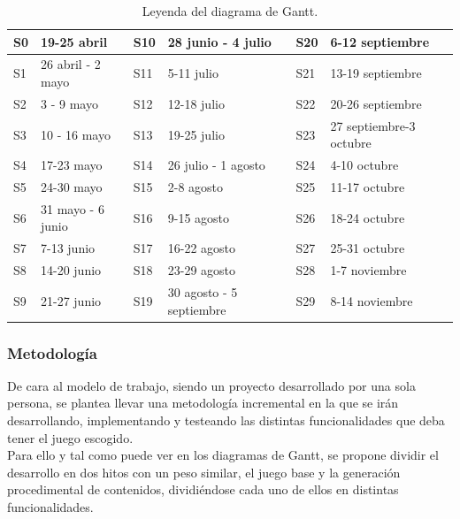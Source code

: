     
    \begin{table}[H]
        \centering
        \caption{Leyenda del diagrama de Gantt.}
        \begin{tabular}{|l|l|l|l|l|l|}
        \hline
        S0 & 19-25 abril       & S10 & 28 junio - 4 julio       & S20 & 6-12 septiembre         \\ \hline
        S1 & 26 abril - 2 mayo & S11 & 5-11 julio               & S21 & 13-19 septiembre        \\ \hline
        S2 & 3 - 9 mayo        & S12 & 12-18 julio              & S22 & 20-26 septiembre        \\ \hline
        S3 & 10 - 16 mayo      & S13 & 19-25 julio              & S23 & 27 septiembre-3 octubre \\ \hline
        S4 & 17-23 mayo        & S14 & 26 julio - 1 agosto      & S24 & 4-10 octubre            \\ \hline
        S5 & 24-30 mayo        & S15 & 2-8 agosto               & S25 & 11-17 octubre           \\ \hline
        S6 & 31 mayo - 6 junio & S16 & 9-15 agosto              & S26 & 18-24 octubre           \\ \hline
        S7 & 7-13 junio        & S17 & 16-22 agosto             & S27 & 25-31 octubre           \\ \hline
        S8 & 14-20 junio       & S18 & 23-29 agosto             & S28 & 1-7 noviembre           \\ \hline
        S9 & 21-27 junio       & S19 & 30 agosto - 5 septiembre & S29 & 8-14 noviembre          \\ \hline
        \end{tabular}
    \end{table}

\subsubsection{Metodología}

    De cara al modelo de trabajo, siendo un proyecto desarrollado por una sola persona, se plantea llevar una metodología incremental en la que se irán desarrollando, implementando y testeando las distintas funcionalidades que deba tener el juego escogido.\\
    
    Para ello y tal como puede ver en los diagramas de Gantt, se propone dividir el desarrollo en dos hitos con un peso similar, el juego base y la generación procedimental de contenidos, dividiéndose cada uno de ellos en distintas funcionalidades.\\
    
